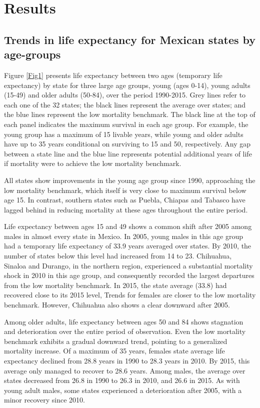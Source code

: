 \documentclass{bmcart}
\begin{document}
\section*{Results}

\subsection*{Trends in life expectancy for Mexican states by age-groups}

Figure \ref{Fig1} presents life expectancy between two ages (temporary life expectancy) by state  for three large age groups, young (ages 0-14), young adults (15-49) and older adults (50-84), over the period 1990-2015. Grey lines refer to each one of the 32 states; the black lines represent the average over states; and the blue lines represent the low mortality benchmark. The black line at the top of each panel indicates the maximum survival in each age group. For example, the young group has a maximum of 15 livable years, while young and older adults have up to 35 years conditional on surviving to 15 and 50, respectively. Any gap between a state line and the blue line represents potential additional years of life if mortality were to achieve the low mortality benchmark.

All states show improvements in the young age group since 1990, approaching the low mortality benchmark, which itself is very close to maximum survival below age 15. In contrast, southern states such as Puebla, Chiapas and Tabasco have lagged behind in reducing mortality at these ages throughout the entire period. 	

Life expectancy between ages 15 and 49 shows a common shift after 2005 among males in almost every state in Mexico. In 2005, young males in this age group had a temporary life expectancy of 33.9 years averaged over states. By 2010, the number of states below this level had increased from 14 to 23. Chihuahua, Sinaloa and Durango, in the northern region, experienced a substantial mortality shock in 2010 in this age group, and consequently recorded the largest departures from the low mortality benchmark. In 2015, the state average (33.8) had recovered close to its 2015 level,
Trends for females are closer to the low mortality benchmark. However, Chihuahua also shows a clear downward after 2005.

Among older adults, life expectancy between ages 50 and 84 shows stagnation and deterioration over the entire period of observation. Even the low mortality benchmark exhibits a gradual downward trend, pointing to a generalized mortality increase. Of a maximum of 35 years, females state average life expectancy declined from 28.8 years in 1990 to 28.3 years in 2010. By 2015, this average only managed to recover to 28.6 years. Among males, the average over states decreased from 26.8 in 1990 to 26.3 in 2010, and 26.6 in 2015. As with young adult males, some states experienced a deterioration after 2005, with a minor recovery since 2010.\\
\end{document}
